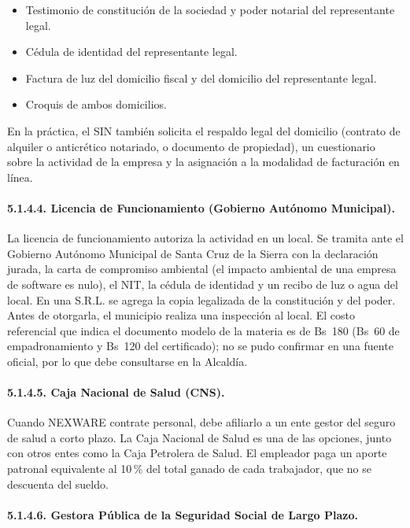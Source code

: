 \begin{itemize}
    \item Testimonio de constitución de la sociedad y poder notarial del representante legal.
    \item Cédula de identidad del representante legal.
    \item Factura de luz del domicilio fiscal y del domicilio del representante legal.
    \item Croquis de ambos domicilios.
\end{itemize}

En la práctica, el SIN también solicita el respaldo legal del domicilio (contrato de alquiler o anticrético notariado, o documento de propiedad), un cuestionario sobre la actividad de la empresa y la asignación a la modalidad de facturación en línea.

\paragraph{5.1.4.4. Licencia de Funcionamiento (Gobierno Autónomo Municipal).}

La licencia de funcionamiento autoriza la actividad en un local. Se tramita ante el Gobierno Autónomo Municipal de Santa Cruz de la Sierra con la declaración jurada, la carta de compromiso ambiental (el impacto ambiental de una empresa de software es nulo), el NIT, la cédula de identidad y un recibo de luz o agua del local. En una S.R.L. se agrega la copia legalizada de la constitución y del poder. Antes de otorgarla, el municipio realiza una inspección al local. El costo referencial que indica el documento modelo de la materia es de Bs~180 (Bs~60 de empadronamiento y Bs~120 del certificado); no se pudo confirmar en una fuente oficial, por lo que debe consultarse en la Alcaldía.

\paragraph{5.1.4.5. Caja Nacional de Salud (CNS).}

Cuando NEXWARE contrate personal, debe afiliarlo a un ente gestor del seguro de salud a corto plazo. La Caja Nacional de Salud es una de las opciones, junto con otros entes como la Caja Petrolera de Salud. El empleador paga un aporte patronal equivalente al 10\,\% del total ganado de cada trabajador, que no se descuenta del sueldo.

\paragraph{5.1.4.6. Gestora Pública de la Seguridad Social de Largo Plazo.}


